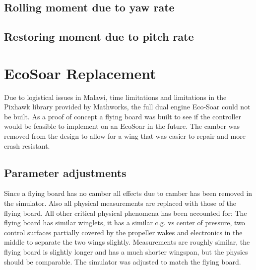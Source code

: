 \documentclass{article}
\begin{document}
\subsection{Rolling moment due to yaw rate}


\subsection{Restoring moment due to pitch rate}









\section{EcoSoar Replacement}
\label{sec:EcoSoarReplacement}
Due to logistical issues in Malawi, time limitations and limitations in the Pixhawk library provided by Mathworks, the full dual engine Eco-Soar could not be built.
As a proof of concept a flying board was built to see if the controller would be feasible to implement on an EcoSoar in the future.
The camber was removed from the design to allow for a wing that was easier to repair and more crash resistant.
\subsection{Parameter adjustments}
Since a flying board has no camber all effects due to camber has been removed in the simulator.
Also all physical measurements are replaced with those of the flying board.
All other critical physical phenomena has been accounted for:
The flying board has similar winglets, it has a similar c.g. vs center of pressure, two control surfaces partially covered by the propeller wakes and electronics in the middle to separate the two wings slightly. 
Measurements are roughly similar, the flying board is slightly longer and has a much shorter wingspan, but the physics should be comparable.
The simulator was adjusted to match the flying board.
\end{document}
